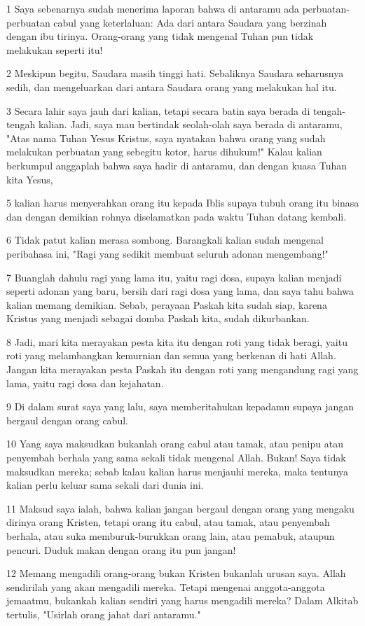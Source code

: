 \par 1 Saya sebenarnya sudah menerima laporan bahwa di antaramu ada perbuatan-perbuatan cabul yang keterlaluan: Ada dari antara Saudara yang berzinah dengan ibu tirinya. Orang-orang yang tidak mengenal Tuhan pun tidak melakukan seperti itu!
\par 2 Meskipun begitu, Saudara masih tinggi hati. Sebaliknya Saudara seharusnya sedih, dan mengeluarkan dari antara Saudara orang yang melakukan hal itu.
\par 3 Secara lahir saya jauh dari kalian, tetapi secara batin saya berada di tengah-tengah kalian. Jadi, saya mau bertindak seolah-olah saya berada di antaramu, "Atas nama Tuhan Yesus Kristus, saya nyatakan bahwa orang yang sudah melakukan perbuatan yang sebegitu kotor, harus dihukum!" Kalau kalian berkumpul anggaplah bahwa saya hadir di antaramu, dan dengan kuasa Tuhan kita Yesus,
\par 5 kalian harus menyerahkan orang itu kepada Iblis supaya tubuh orang itu binasa dan dengan demikian rohnya diselamatkan pada waktu Tuhan datang kembali.
\par 6 Tidak patut kalian merasa sombong. Barangkali kalian sudah mengenal peribahasa ini, "Ragi yang sedikit membuat seluruh adonan mengembang!"
\par 7 Buanglah dahulu ragi yang lama itu, yaitu ragi dosa, supaya kalian menjadi seperti adonan yang baru, bersih dari ragi dosa yang lama, dan saya tahu bahwa kalian memang demikian. Sebab, perayaan Paskah kita sudah siap, karena Kristus yang menjadi sebagai domba Paskah kita, sudah dikurbankan.
\par 8 Jadi, mari kita merayakan pesta kita itu dengan roti yang tidak beragi, yaitu roti yang melambangkan kemurnian dan semua yang berkenan di hati Allah. Jangan kita merayakan pesta Paskah itu dengan roti yang mengandung ragi yang lama, yaitu ragi dosa dan kejahatan.
\par 9 Di dalam surat saya yang lalu, saya memberitahukan kepadamu supaya jangan bergaul dengan orang cabul.
\par 10 Yang saya maksudkan bukanlah orang cabul atau tamak, atau penipu atau penyembah berhala yang sama sekali tidak mengenal Allah. Bukan! Saya tidak maksudkan mereka; sebab kalau kalian harus menjauhi mereka, maka tentunya kalian perlu keluar sama sekali dari dunia ini.
\par 11 Maksud saya ialah, bahwa kalian jangan bergaul dengan orang yang mengaku dirinya orang Kristen, tetapi orang itu cabul, atau tamak, atau penyembah berhala, atau suka memburuk-burukkan orang lain, atau pemabuk, ataupun pencuri. Duduk makan dengan orang itu pun jangan!
\par 12 Memang mengadili orang-orang bukan Kristen bukanlah urusan saya. Allah sendirilah yang akan mengadili mereka. Tetapi mengenai anggota-anggota jemaatmu, bukankah kalian sendiri yang harus mengadili mereka? Dalam Alkitab tertulis, "Usirlah orang jahat dari antaramu."


